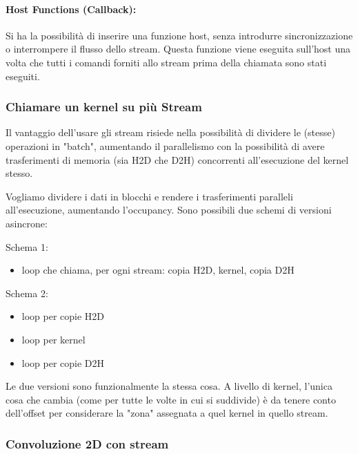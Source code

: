 \paragraph{Host Functions (Callback):} Si ha la possibilità di inserire una funzione host, senza introdurre sincronizzazione o interrompere il flusso dello stream. Questa funzione viene eseguita sull'host una volta che tutti i comandi forniti allo stream prima della chiamata sono stati eseguiti.

\subsubsection{Chiamare un kernel su più Stream}

Il vantaggio dell'usare gli stream risiede nella possibilità di dividere le (stesse) operazioni in "batch", aumentando il parallelismo con la possibilità di avere trasferimenti di memoria (sia H2D che D2H) concorrenti all'esecuzione del kernel stesso. 

Vogliamo dividere i dati in blocchi e rendere i trasferimenti paralleli all'esecuzione, aumentando l'occupancy. Sono possibili due schemi di versioni asincrone: 

\begin{minipage}{.4\linewidth}
	Schema 1: 
	\begin{itemize}
		\item loop che chiama, per ogni stream: copia H2D, kernel, copia D2H
	\end{itemize}
\end{minipage}
\hfill 
\begin{minipage}{.4\linewidth}
	Schema 2:
	\begin{itemize}
		\item loop per copie H2D
		
		\item loop per kernel
		
		\item loop per copie D2H
	\end{itemize} 
\end{minipage}

Le due versioni sono funzionalmente la stessa cosa. A livello di kernel, l'unica cosa che cambia (come per tutte le volte in cui si suddivide) è da tenere conto dell'offset per considerare la "zona" assegnata a quel kernel in quello stream.

\subsubsection{Convoluzione 2D con stream}

